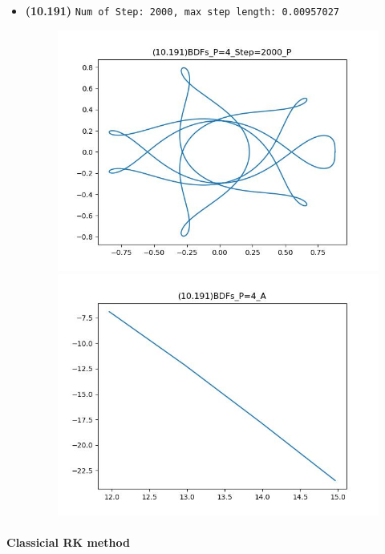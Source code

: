 \documentclass{article}
\begin{document}
\begin{enumerate}
\begin{itemize}
\begin{figure}[h]
        \end{figure}
        \item \textbf{(10.191)} \verb|Num of Step: 2000, max step length: 0.00957027|
        \begin{figure}[h]
            \centering
            \includegraphics[width = 0.45\linewidth]{(10.191)BDFs_P=4_Step=2000_P.jpg}
            \includegraphics[width = 0.45\linewidth]{(10.191)BDFs_P=4_A.jpg}
        \end{figure}
    \end{itemize}
\end{enumerate}

\paragraph{Classicial RK method}
\end{document}

